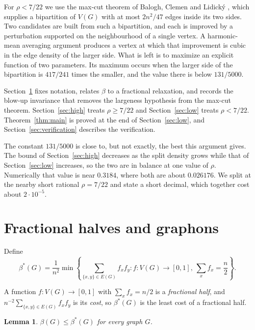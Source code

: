 \documentclass[11pt,reqno]{amsart}
\theoremstyle{plain}
\newtheorem{lemma}[theorem]{Lemma}
\newcommand{\opt}{\beta}
\newcommand{\optf}{\beta^{*}}
\newcommand{\dens}{\rho}
\begin{document}
For $\dens<7/22$ we use the max-cut theorem of Balogh, Clemen and Lidick\'y
\cite{bcl}, which supplies a bipartition of $V(G)$ with at most $2n^{2}/47$
edges inside its two sides.  Two candidates are built from such a bipartition,
and each is improved by a perturbation supported on the neighbourhood of a
single vertex.  A harmonic-mean averaging argument produces
a vertex at which that improvement is cubic in the edge density of the larger
side.  What is left is to maximize an explicit function of two parameters.  Its
maximum occurs when the larger side of the bipartition is $417/241$ times the
smaller, and the value there is below $131/5000$.

Section~\ref{sec:background} fixes notation, relates $\opt$ to a fractional
relaxation, and records the blow-up invariance that removes the largeness
hypothesis from the max-cut theorem.  Section~\ref{sec:high} treats
$\dens\ge7/22$ and Section~\ref{sec:low} treats $\dens<7/22$.
Theorem~\ref{thm:main} is proved at the end of Section~\ref{sec:low}, and
Section~\ref{sec:verification} describes the verification.

The constant $131/5000$ is close to, but not exactly, the best this argument
gives.  The bound of Section~\ref{sec:high} decreases as the split density
grows while that of Section~\ref{sec:low} increases, so the two are in balance
at one value of $\dens$.  Numerically that value is near $0.3184$, where both
are about $0.026176$.  We split at the nearby short rational $\dens=7/22$ and
state a short decimal, which together cost about $2\cdot10^{-5}$.

\section{Fractional halves and graphons}\label{sec:background}

Define
\begin{equation}\label{eq:b-def}
 \optf(G)=\frac1{n^2}\min\left\{
 \sum_{\{x,y\}\in E(G)}f_xf_y:
 f:V(G)\to[0,1],\ \sum_x f_x=\frac n2
 \right\}.
\end{equation}

A function $f:V(G)\to[0,1]$ with $\sum_xf_x=n/2$ is a \emph{fractional half},
and $n^{-2}\sum_{\{x,y\}\in E(G)}f_xf_y$ is its \emph{cost}, so $\optf(G)$ is the
least cost of a fractional half.

\begin{lemma}\label{lem:rounding}
$\opt(G)\le\optf(G)$ for every graph $G$.
\end{lemma}
\end{document}
